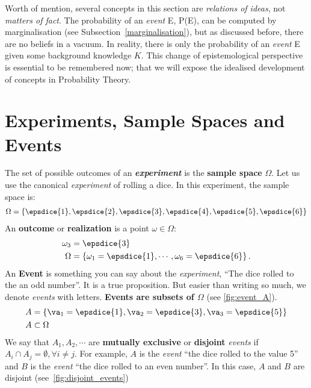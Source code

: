 Worth of mention, several concepts in this section are \emph{relations of ideas}, not \emph{matters of fact}. The probability of an \emph{event} E, P(E), can be computed by marginalisation (see Subsection~\ref{marginalisation}), but as discussed before, there are no beliefs in a vacuum. In reality, there is only the probability of an \emph{event} E given some background knowledge \(K\). This change of epistemological perspective is essential to be remembered now; that we will expose the idealised development of concepts in Probability Theory.


\section{Experiments, Sample Spaces and Events}

The set of possible outcomes of an \textbf{\emph{experiment}} is the \textbf{sample space} \(\Omega\). Let us use the canonical \emph{experiment} of rolling a dice. In this experiment, the sample space is:
\begin{align*}
	\Omega = \left\{\epsdice{1},\epsdice{2},\epsdice{3},\epsdice{4},\epsdice{5},\epsdice{6} \right\}
\end{align*}
An \textbf{outcome} or \textbf{realization} is a point $\omega \in \Omega$:
\begin{align*}
	\omega_3&=\epsdice{3}\\
	\Omega &= \left\{\omega_1=\epsdice{1},\cdots,\omega_6=\epsdice{6} \right\}.
\end{align*}
An \textbf{Event} is something you can say about the \emph{experiment}, \eg ``The dice rolled to the an odd number''. It is a true proposition. But easier than writing so much, we denote \emph{events} with letters. \textbf{Events are subsets of \(\Omega\)} (see \cref{fig:event_A}).
\begin{align*}
	A &= \left\{\va_1=\epsdice{1}, \va_2=\epsdice{3}, \va_3=\epsdice{5} \right\}\\
	A &\subset \Omega
\end{align*}
We say that $A_1, A_2, \cdots$ are \textbf{mutually exclusive} or \textbf{disjoint} \emph{events} if $A_i \cap A_j=\emptyset, \forall i\neq j$. For example, \(A\) is the \emph{event} ``the dice rolled to the value 5'' and \(B\) is the \emph{event} ``the dice rolled to an even number''. In this case, \(A\) and \(B\) are disjoint (see~\cref{fig:disjoint_events})
